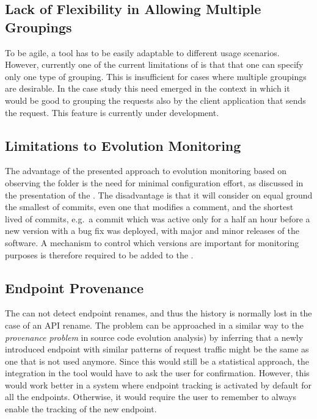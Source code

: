   \subsection*{Lack of Flexibility in Allowing Multiple Groupings}

    To be agile, a tool has to be easily adaptable to different usage scenarios. However, currently one of the current limitations of \tool is that that one can specify only one type of grouping. This is insufficient for cases where multiple groupings are desirable. In the \zee case study this need emerged in the context in which it would be good to grouping the requests also by the client application that sends the request. This feature is currently under development.

  \subsection*{Limitations to Evolution Monitoring}

      The advantage of the presented approach to evolution monitoring based on observing the  folder is the need for minimal configuration effort, as discussed in the presentation of the \tool. The disadvantage is that it will consider on equal ground the smallest of commits, even one that modifies a comment, and the shortest lived of commits, e.g.~a commit which was active only for a half an hour before a new version with a bug fix was deployed, with major and minor releases of the software. %
    A mechanism to control which versions are important for monitoring purposes is therefore required to be added to the \tool.


  \subsection*{Endpoint Provenance }

    The \tool can not detect endpoint renames, and thus the history is normally lost in the case of an API rename. The problem can be approached in a similar way to the {\em provenance problem} in source code evolution analysis)\cite{Davi11a} by inferring that a newly introduced endpoint with similar patterns of request traffic might be the same as one that is not used anymore. Since this would still be a statistical approach, the integration in the tool would have to ask the user for confirmation. 
    However, this would work better in a system where endpoint tracking is activated by default for all the endpoints. Otherwise, it would require the user to remember to always enable the tracking of the new endpoint. 


